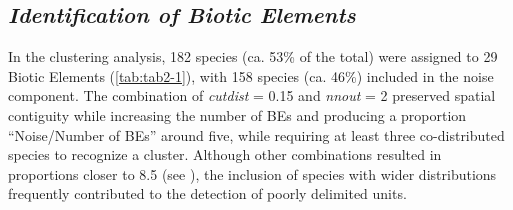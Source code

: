 \documentclass[12pt,openright,oneside,a4paper,english]{abntex2}
\begin{document}
\subsection{\textit{Identification of Biotic Elements}}

In the clustering analysis, 182 species (ca. 53\% of the total) were assigned to 29 Biotic Elements (\autoref{tab:tab2-1}), with 158 species (ca. 46\%) included in the noise component. The combination of \textit{cutdist} = 0.15 and \textit{nnout} = 2 preserved spatial contiguity while increasing the number of BEs and producing a proportion “Noise/Number of BEs” around five, while requiring at least three co-distributed species to recognize a cluster. Although other combinations resulted in proportions closer to 8.5 (see ), the inclusion of species with wider distributions frequently contributed to the detection of poorly delimited units.
\end{document}
